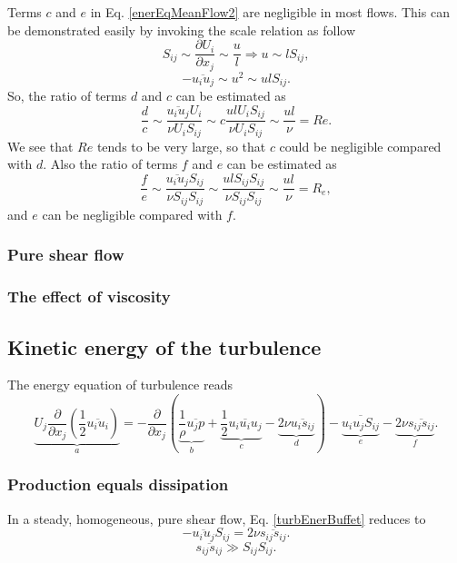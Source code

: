 \documentclass[review]{elsarticle}
\begin{document}
		Terms $c$ and $e$ in Eq. \ref{enerEqMeanFlow2} are negligible in most flows. This can be demonstrated easily by invoking 
		the scale relation as follow
		\begin{equation}
			S_{ij} \sim \frac{\partial U_i}{\partial x_j} \sim \frac{u}{l} \Rightarrow u \sim lS_{ij}, 
		\end{equation}
		\begin{equation}
			-\overline{u_iu_j} \sim u^2 \sim ulS_{ij}.
		\end{equation}
		So, the ratio of terms $d$ and $c$ can be estimated as
		\begin{equation}
			\frac{d}{c} \sim \frac{\overline{u_iu_j}U_i}{\nu U_iS_{ij}} \sim c\frac{ulU_iS_{ij}}{\nu U_iS_{ij}} \sim \frac{ul}{\nu}
			= Re.
		\end{equation}
		We see that $Re$ tends to be very large, so that $c$ could be negligible compared with $d$.
		Also the ratio of terms $f$ and $e$ can be estimated as
		\begin{equation}
			\frac{f}{e} \sim \frac{\overline{u_iu_j}S_{ij}}{\nu S_{ij}S_{ij}} \sim \frac{ulS_{ij}S_{ij}}{\nu S_{ij}S_{ij}}
			\sim \frac{ul}{\nu} = R_e, 
		\end{equation} 
		and $e$ can be negligible compared with $f$.
		\subsubsection{Pure shear flow}
		\subsubsection{The effect of viscosity}
	\subsection{Kinetic energy of the turbulence}
		The energy equation of turbulence reads
		\begin{equation}\label{turbEnerBuffet}
			\underbrace {U_j\frac{\partial}{\partial x_j}(\frac{1}{2}\overline{u_iu_i})}_a = -\frac{\partial}{\partial x_j}(
				\underbrace{\frac{1}{\rho}\overline{u_jp}}_b + 
				\underbrace{\frac{1}{2}\overline{u_iu_iu_j}}_c - 
				\underbrace{2\nu \overline{u_is_{ij}}}_d
			) - \underbrace{\overline{u_iu_jS_{ij}}}_e - \underbrace{2\nu \overline{s_{ij}s_{ij}}}_f.
		\end{equation} 
		\subsubsection{Production equals dissipation}
			In a steady, homogeneous, pure shear flow, Eq. \ref{turbEnerBuffet} reduces to
			\begin{equation}
				-\overline{u_iu_j}S_{ij} = 2\nu\overline{s_{ij}s_{ij}}.
			\end{equation}
			\begin{equation}
				\overline{s_{ij}s_{ij}} \gg S_{ij}S_{ij}.
			\end{equation}
\end{document}
